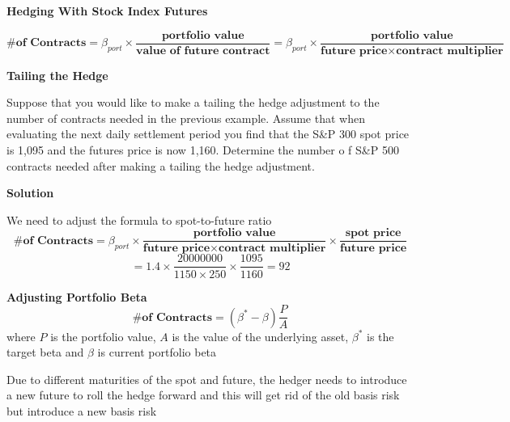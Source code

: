 \documentclass[11pt,fleqn]{report} %
\numberwithin{equation}{section} %
\numberwithin{figure}{section} %
\numberwithin{table}{section} %
\begin{document}
\begin{theorem}\textbf{Hedging With Stock Index Futures}

$$
\textbf{\# of Contracts}=\beta_{port}\times\frac{\textbf{portfolio value}}{\textbf{value of future contract}}=\beta_{port}\times\frac{\textbf{portfolio value}}{\textbf{future price}\times\textbf{contract multiplier}}
$$
\end{theorem}
\begin{exercise}\textbf{Tailing the Hedge}

Suppose that you would like to make a tailing the hedge adjustment to the number of
contracts needed in the previous example. Assume that when evaluating the next daily
settlement period you find that the S\&P 300 spot price is 1,095 and the futures price is
now 1,160. Determine the number o f S\&P 500 contracts needed after making a tailing
the hedge adjustment.

\textbf{Solution}

We need to adjust the formula to spot-to-future ratio
$$
\textbf{\# of Contracts}=\beta_{port}\times\frac{\textbf{portfolio value}}{\textbf{future price}\times\textbf{contract multiplier}}\times\frac{\textbf{spot price}}{\textbf{future price}}
$$
$$
=1.4\times\frac{20000000}{1150\times 250}\times\frac{1095}{1160}=92
$$
\end{exercise}

\begin{theorem}\textbf{Adjusting Portfolio Beta}\\
$$
\textbf{\# of Contracts}=(\beta^*-\beta)\frac{P}{A}
$$
where $P$ is the portfolio value, $A$ is the value of the underlying asset, $\beta^*$ is the target beta and $\beta$ is current portfolio beta
\end{theorem}
\begin{remark}
Due to different maturities of the spot and future, the hedger needs to introduce a new future to roll the hedge forward and this will get rid of the old basis risk but introduce a new basis risk
\end{remark}
\end{document}
